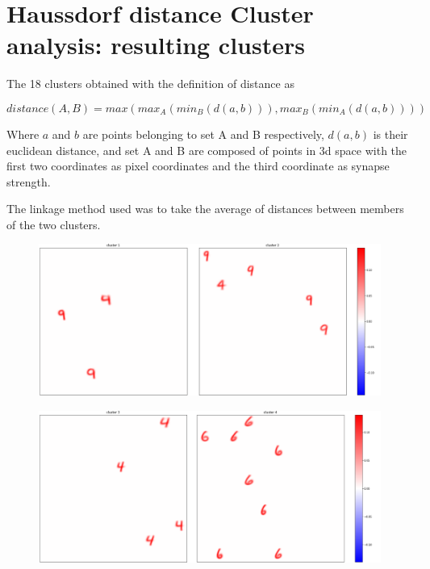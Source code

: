 \documentclass[a4paper]{report}
\begin{document}
\appendix

\chapter{Haussdorf distance Cluster analysis: resulting clusters}

The 18 clusters obtained with the definition of distance as

\begin{equation}
    distance(A, B) = max(max_A(min_B(d(a,b))), max_B(min_A(d(a,b))))
\end{equation}

Where $a$ and $b$ are points belonging to set A and B respectively, $d(a,b)$ is their euclidean distance, and set A and B are composed of points in 3d space with the first two coordinates as pixel coordinates and the third coordinate as synapse strength.

The linkage method used was to take the average of distances between members of the two clusters.

\begin{figure} [H]
    \centering
    \includegraphics [width=\textwidth ] {c/h/1.png}
    \caption{}
\end{figure}

\begin{figure} [H]
    \centering
    \includegraphics [width=\textwidth ] {c/h/3.png}
    \caption{}
\end{figure}
\end{document}
